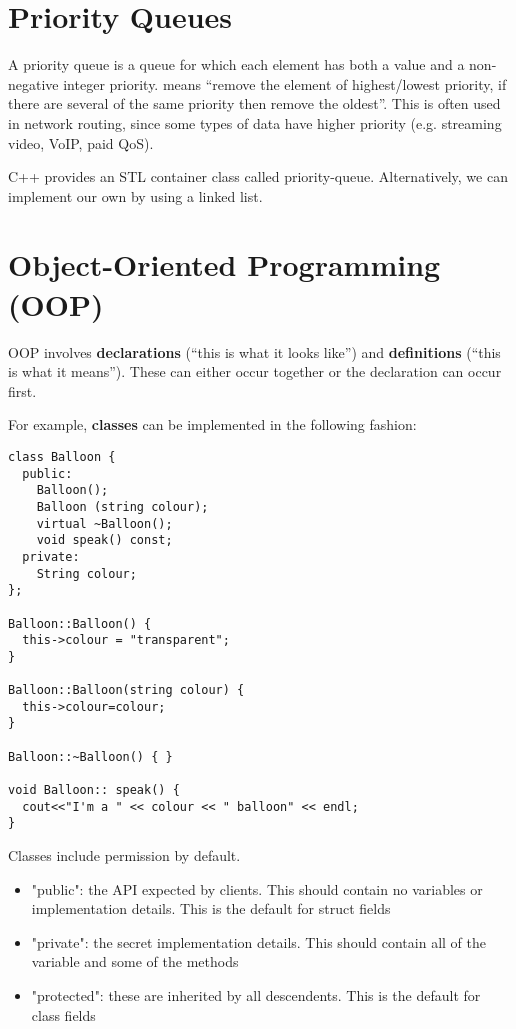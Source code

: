 \documentclass[12pt]{article}
\begin{document}
\section*{Priority Queues}
A priority queue is a queue for which each element has both a value and a non-negative integer priority.  means ``remove the element of highest/lowest priority, if there are several of the same priority then remove the oldest''. This is often used in network routing, since some types of data have higher priority (e.g. streaming video, VoIP, paid QoS).

C++ provides an STL container class called priority-queue. Alternatively, we can implement our own by using a linked list.

\section*{Object-Oriented Programming (OOP)}
OOP involves {\bf declarations} (``this is what it looks like'') and {\bf definitions} (``this is what it means''). These can either occur together or the declaration can occur first.

For example, {\bf classes} can be implemented in the following fashion:

\begin{verbatim}
class Balloon {
  public:
    Balloon();
    Balloon (string colour);
    virtual ~Balloon();
    void speak() const;
  private:
    String colour;
};

Balloon::Balloon() {
  this->colour = "transparent";
}

Balloon::Balloon(string colour) {
  this->colour=colour;
}

Balloon::~Balloon() { }

void Balloon:: speak() {
  cout<<"I'm a " << colour << " balloon" << endl;
}
\end{verbatim}

Classes include permission by default.
\begin{itemize}
\item "public": the API expected by clients. This should contain no variables or implementation details. This is the default for struct fields
\item "private": the secret implementation details. This should contain all of the variable and some of the methods
\item "protected": these are inherited by all descendents. This is the default for class fields
\end{itemize}
\end{document}
